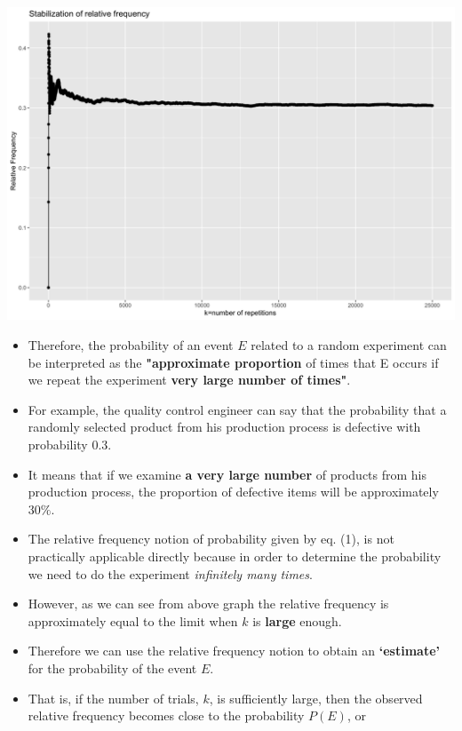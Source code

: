 \documentclass[]{book}
\providecommand{\tightlist}{%
  \setlength{\itemsep}{0pt}\setlength{\parskip}{0pt}}
\begin{document}
\begin{center}\includegraphics[width=0.9\linewidth]{figure/rfrq-1} \end{center}

\begin{itemize}
\tightlist
\item
  Therefore, the probability of an event \(E\) related to a random experiment can be interpreted as the \textbf{"approximate proportion} of times that E occurs if we repeat the experiment \textbf{very large number of times"}.
\item
  For example, the quality control engineer can say that the probability that a randomly selected product from his production process is defective with probability 0.3.
\item
  It means that if we examine \textbf{a very large number} of products from his production process, the proportion of defective items will be approximately \(30\%\).
\item
  The relative frequency notion of probability given by eq. (1), is not practically applicable directly because in order to determine the probability we need to do the experiment \emph{inﬁnitely many times}.
\item
  However, as we can see from above graph the relative frequency is approximately equal to the limit when \(k\) is \textbf{large} enough.
\item
  Therefore we can use the relative frequency notion to obtain an \textbf{`estimate'} for the probability of the event \(E\).
\item
  That is, if the number of trials, \(k\), is sufficiently large, then the observed relative frequency becomes close to the probability \(P(E)\), or
\end{itemize}
\end{document}
